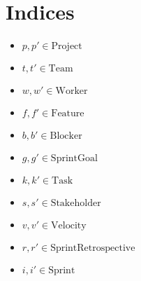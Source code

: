 \documentclass[11pt]{article}
\begin{document}
\section{Indices}
\begin{itemize}
    \item $p, p' \in \text{Project}$
    \item $t, t' \in \text{Team}$
    \item $w, w' \in \text{Worker}$
    \item $f, f' \in \text{Feature}$
    \item $b, b' \in \text{Blocker}$
    \item $g, g' \in \text{SprintGoal}$
    \item $k, k' \in \text{Task}$
    \item $s, s' \in \text{Stakeholder}$
    \item $v, v' \in \text{Velocity}$
    \item $r, r' \in \text{SprintRetrospective}$
    \item $i, i' \in \text{Sprint}$
\end{itemize}
\end{document}
